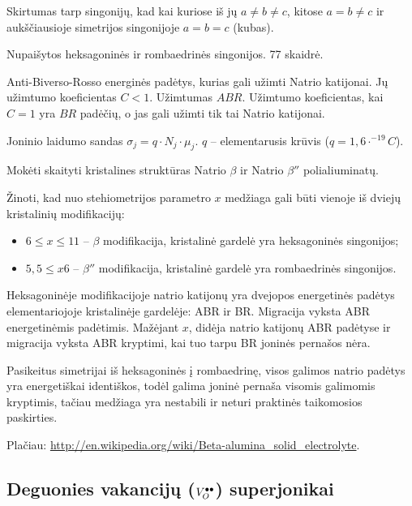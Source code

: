 Skirtumas tarp singonijų, kad kai kuriose iš jų $a \neq b \neq c$,
kitose $a = b \neq c$ ir aukščiausioje simetrijos singonijoje
$a = b = c$ (kubas).

Nupaišytos heksagoninės ir rombaedrinės singonijos. 77 skaidrė.

Anti-Biverso-Rosso energinės padėtys, kurias gali užimti Natrio
katijonai. Jų užimtumo koeficientas $C < 1$. Užimtumas $ABR$.
Užimtumo koeficientas, kai $C=1$ yra $BR$ padėčių, o jas gali užimti
tik tai Natrio katijonai.

Joninio laidumo sandas $\sigma_{j} = q\cdot N_{j} \cdot \mu_{j}$.
$q$ – elementarusis krūvis ($q = 1,6 \cdot^{-19}C$).

\begin{remember}
  \item Mokėti skaityti kristalines struktūras Natrio $\beta$ ir
    Natrio $\beta''$ polialiuminatų.
  \item Žinoti, kad nuo stehiometrijos parametro $x$ medžiaga gali
    būti vienoje iš dviejų kristalinių modifikacijų:
    \begin{itemize}
      \item $6 \leq x \leq 11$ – $\beta$ modifikacija, kristalinė
        gardelė yra heksagoninės singonijos;
      \item $5,5 \leq x 6$ – $\beta''$ modifikacija, kristalinė
        gardelė yra rombaedrinės singonijos.
    \end{itemize}
  \item Heksagoninėje modifikacijoje natrio katijonų yra dvejopos
    energetinės padėtys elementariojoje kristalinėje gardelėje:
    ABR ir BR. Migracija vyksta ABR energetinėmis padėtimis.
    Mažėjant $x$, didėja natrio katijonų ABR padėtyse ir migracija
    vyksta ABR kryptimi, kai tuo tarpu BR joninės pernašos nėra.
  \item Pasikeitus simetrijai iš heksagoninės į rombaedrinę, visos
    galimos natrio padėtys yra energetiškai identiškos, todėl
    galima joninė pernaša visomis galimomis kryptimis, tačiau
    medžiaga yra nestabili ir neturi praktinės taikomosios paskirties.
\end{remember}

Plačiau: \url{http://en.wikipedia.org/wiki/Beta-alumina_solid_electrolyte}.

\subsection{Deguonies vakancijų ($V_{O}^{\bullet \bullet}$) superjonikai}

